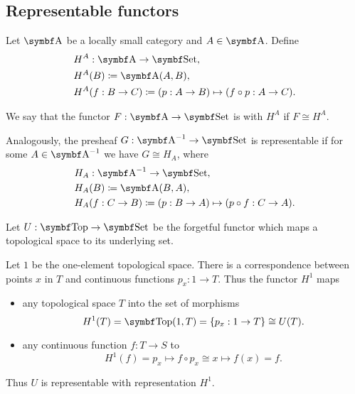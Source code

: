 \subsection{Representable functors}\label{subsec:representable_functors}

\begin{definition}\label{def:representable_functor}\cite[definitions 4.1.3, 4.1.16]{Leinster2014}
  Let \( \Cat{A} \) be a locally small category and \( A \in \Cat{A} \). Define
  \begin{align*}
    &H^A: \Cat{A} \to \Cat{Set}, \\
    &H^A(B) \coloneqq \Cat{A}(A, B), \\
    &H^A(f: B \to C) \coloneqq (p: A \to B) \mapsto (f \circ p: A \to C).
  \end{align*}

  We say that the functor \( F: \Cat{A} \to \Cat{Set} \) is  with  \( H^A \) if \( F \cong H^A \).

  Analogously, the presheaf \( G: \Cat{A}^{-1} \to \Cat{Set} \) is representable if for some \( A \in \Cat{A}^{-1} \) we have \( G \cong H_A \), where
  \begin{align*}
    &H_A: \Cat{A}^{-1} \to \Cat{Set}, \\
    &H_A(B) \coloneqq \Cat{A}(B, A), \\
    &H_A(f: C \to B) \coloneqq (p: B \to A) \mapsto (p \circ f: C \to A).
  \end{align*}
\end{definition}

\begin{example}\label{def:top_representable_functor}\cite[example 4.1.4]{Leinster2014}
  Let \( U: \Cat{Top} \to \Cat{Set} \) be the forgetful functor which maps a topological space to its underlying set.

  Let \( 1 \) be the one-element topological space. There is a correspondence between points \( x \) in \( T \) and continuous functions \( p_x: 1 \to T \). Thus the functor \( H^1 \) maps
  \begin{itemize}
    \item any topological space \( T \) into the set of morphisms
    \begin{equation*}
      H^1(T) = \Cat{Top}(1, T) = \{ p_x: 1 \to T \} \cong U(T).
    \end{equation*}
    \item any continuous function \( f: T \to S \) to
    \begin{equation*}
      H^1(f) = p_x \mapsto f \circ p_x \cong x \mapsto f(x) = f.
    \end{equation*}
  \end{itemize}

  Thus \( U \) is representable with representation \( H^1 \).
\end{example}

